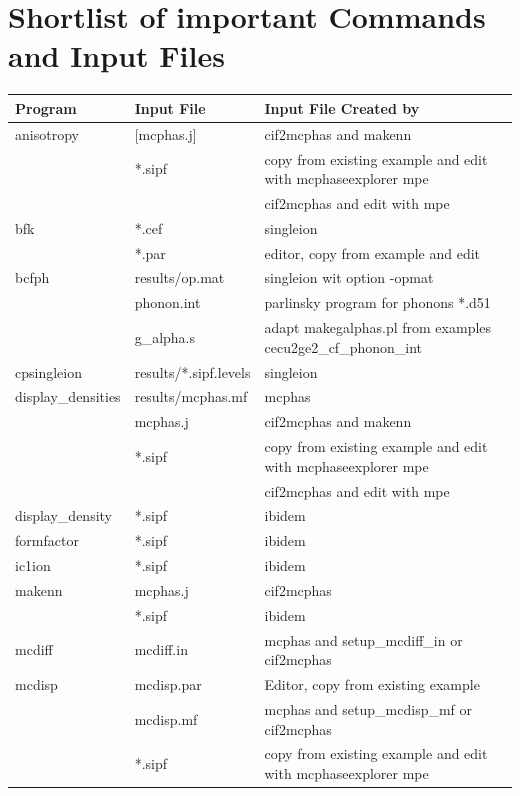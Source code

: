 \section{Shortlist of important Commands and Input Files}\label{shortlist}
\small

\begin{table}
\label{tab:shortlist}
\begin{tabular}{lll}
\hline
Program	&	Input File	&	Input File Created by \\
\hline
anisotropy & 	[mcphas.j]	&	cif2mcphas and makenn \\
		&	*.sipf		&	copy from existing example and edit with mcphaseexplorer mpe \\
		&			&	cif2mcphas and edit with mpe \\	
bfk		&	*.cef		&     singleion \\
		&      *.par           &    editor, copy from example and edit \\	
bcfph          &  results/op.mat  & singleion wit option  -opmat  \\
                &   phonon.int     &     parlinsky program for phonons *.d51 \\
                &  g\_alpha.s      &  adapt makegalphas.pl from examples cecu2ge2\_cf\_phonon\_int \\  
cpsingleion	&	results/*.sipf.levels &	singleion \\
display\_densities &	results/mcphas.mf &	mcphas \\	
		&	mcphas.j	&	cif2mcphas and makenn \\
		&	*.sipf		&	copy from existing example and edit with mcphaseexplorer mpe \\
		&			&	cif2mcphas and edit with mpe \\		
display\_density &	*.sipf		&	ibidem \\
formfactor	&	*.sipf		&	ibidem \\	
ic1ion		&	*.sipf		&	ibidem \\
makenn		&	mcphas.j	&	cif2mcphas\\
		&	*.sipf		&	ibidem \\		
mcdiff		&	mcdiff.in	&  	mcphas and setup\_mcdiff\_in or cif2mcphas \\
mcdisp		&	mcdisp.par	&	Editor, copy from existing example \\
	&		mcdisp.mf	&	mcphas and setup\_mcdisp\_mf or cif2mcphas \\
		&	*.sipf		&	copy from existing example and edit with mcphaseexplorer mpe \\

\end{tabular}
\end{table}
